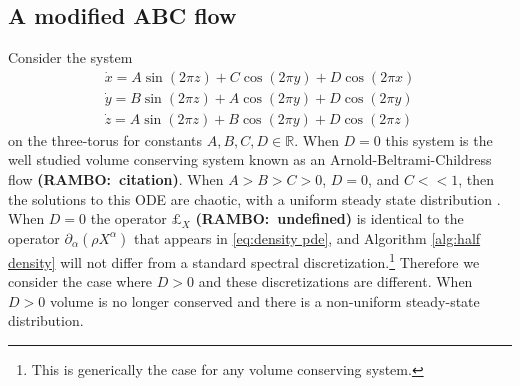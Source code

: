 \documentclass[final,leqno]{siamltex1213}
\newcommand{\ram}[1]{{\normalsize{\textbf{({\color{red}RAMBO:\ }#1)}}}}
\begin{document}
%
%


\subsection{A modified ABC flow}
\label{sec:ABC_flow}

Consider the system
\begin{align}
	\dot{x} = A \sin( 2\pi z) + C \cos(2\pi y)  + D \cos(2\pi x)\\
	\dot{y} = B \sin( 2\pi z) + A \cos(2\pi y)  + D \cos(2\pi y)\\
	\dot{z} = A \sin( 2\pi z) + B \cos(2\pi y)  + D \cos(2\pi z)
\end{align}
on the three-torus for constants $A,B,C,D \in \mathbb{R}$.  
When $D=0$ this system is the well studied volume conserving system known as an Arnold-Beltrami-Childress flow \ram{citation}.
When $A > B > C > 0$, $D=0$, and $C << 1$, then the solutions to this ODE are chaotic, with a uniform steady state distribution \cite{MajdaBertozzi2002}.
When $D=0$ the operator $\pounds_{X}$ \ram{undefined} is identical to the operator $\partial_{\alpha}( \rho X^{\alpha})$ that appears in \eqref{eq:density pde}, and Algorithm \ref{alg:half density} will not differ from a standard spectral discretization.\footnote{This is generically the case for any volume conserving system.}
Therefore we consider the case where $D > 0$ and these discretizations are different.
When $D> 0$ volume is no longer conserved and there is a non-uniform steady-state distribution.
\end{document}
